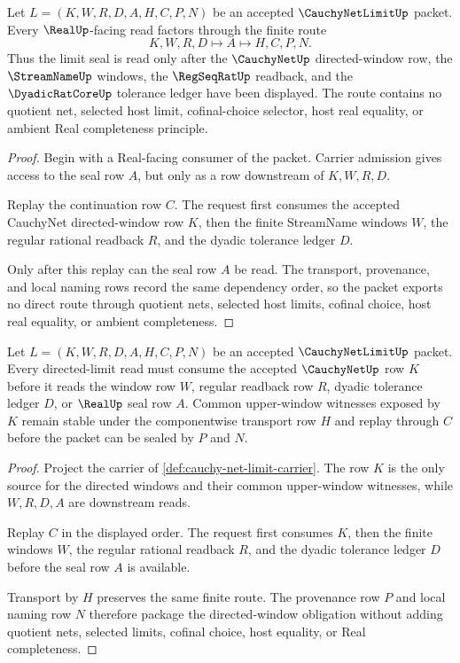 \begin{theorem}
\label{thm:cauchy-net-limit-real-seal-handoff}
Let $L=(K,W,R,D,A,H,C,P,N)$ be an accepted $\CauchyNetLimitUp$ packet. Every $\RealUp$-facing read factors through the finite route
$$
K,W,R,D \longmapsto A \longmapsto H,C,P,N .
$$
Thus the limit seal is read only after the $\CauchyNetUp$ directed-window row, the $\StreamNameUp$ windows, the $\RegSeqRatUp$ readback, and the $\DyadicRatCoreUp$ tolerance ledger have been displayed. The route contains no quotient net, selected host limit, cofinal-choice selector, host real equality, or ambient Real completeness principle.
\end{theorem}
\begin{proof}
Begin with a Real-facing consumer of the packet. Carrier admission gives access to the seal row $A$, but only as a row downstream of $K,W,R,D$.

Replay the continuation row $C$. The request first consumes the accepted CauchyNet directed-window row $K$, then the finite StreamName windows $W$, the regular rational readback $R$, and the dyadic tolerance ledger $D$.

Only after this replay can the seal row $A$ be read. The transport, provenance, and local naming rows record the same dependency order, so the packet exports no direct route through quotient nets, selected host limits, cofinal choice, host real equality, or ambient completeness.
\end{proof}

\begin{theorem}
\label{thm:cauchy-net-limit-directed-window-obligations}
Let $L=(K,W,R,D,A,H,C,P,N)$ be an accepted $\CauchyNetLimitUp$ packet. Every directed-limit read must consume the accepted $\CauchyNetUp$ row $K$ before it reads the window row $W$, regular readback row $R$, dyadic tolerance ledger $D$, or $\RealUp$ seal row $A$. Common upper-window witnesses exposed by $K$ remain stable under the componentwise transport row $H$ and replay through $C$ before the packet can be sealed by $P$ and $N$.
\end{theorem}
\begin{proof}
Project the carrier of \autoref{def:cauchy-net-limit-carrier}. The row $K$ is the only source for the directed windows and their common upper-window witnesses, while $W,R,D,A$ are downstream reads.

Replay $C$ in the displayed order. The request first consumes $K$, then the finite windows $W$, the regular rational readback $R$, and the dyadic tolerance ledger $D$ before the seal row $A$ is available.

Transport by $H$ preserves the same finite route. The provenance row $P$ and local naming row $N$ therefore package the directed-window obligation without adding quotient nets, selected limits, cofinal choice, host equality, or Real completeness.
\end{proof}

